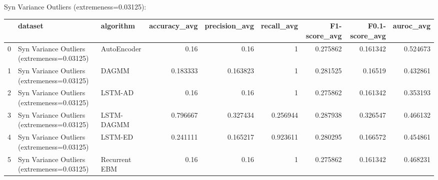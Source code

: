 Syn Variance Outliers (extremeness=0.03125):

\begin{tabular}{rllrrrrrr}
\hline
    & dataset                                     & algorithm     &   accuracy\_avg &   precision\_avg &   recall\_avg &   F1-score\_avg &   F0.1-score\_avg &   auroc\_avg \\
\hline
  0 & Syn Variance Outliers (extremeness=0.03125) & AutoEncoder   &       0.16     &        0.16     &     1        &       0.275862 &         0.161342 &    0.524673 \\
  1 & Syn Variance Outliers (extremeness=0.03125) & DAGMM         &       0.183333 &        0.163823 &     1        &       0.281525 &         0.16519  &    0.432861 \\
  2 & Syn Variance Outliers (extremeness=0.03125) & LSTM-AD       &       0.16     &        0.16     &     1        &       0.275862 &         0.161342 &    0.353193 \\
  3 & Syn Variance Outliers (extremeness=0.03125) & LSTM-DAGMM    &       0.796667 &        0.327434 &     0.256944 &       0.287938 &         0.326547 &    0.466132 \\
  4 & Syn Variance Outliers (extremeness=0.03125) & LSTM-ED       &       0.241111 &        0.165217 &     0.923611 &       0.280295 &         0.166572 &    0.454861 \\
  5 & Syn Variance Outliers (extremeness=0.03125) & Recurrent EBM &       0.16     &        0.16     &     1        &       0.275862 &         0.161342 &    0.468231 \\
\hline
\end{tabular}

